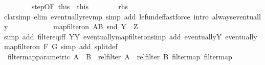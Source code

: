 \begin{isabellebody}
\ \ \ \ \ \ \isamarkupfalse%
\ step{\isacharbrackleft}{\kern0pt}OF\ this{\isacharparenleft}{\kern0pt}{}{\isacharcomma}{\kern0pt}\ {}{\isacharparenright}{\kern0pt}{\isacharbrackright}{\kern0pt}\ this{\isacharparenleft}{\kern0pt}{}{\isacharparenright}{\kern0pt}\isanewline
\ \ \ \ \ \ \isamarkupfalse%
\ {\isacharquery}{\kern0pt}rhs\ \isamarkupfalse%
{\isacharparenleft}{\kern0pt}clarsimp\ elim{\isacharbang}{\kern0pt}{\isacharcolon}{\kern0pt}\ eventually{\isacharunderscore}{\kern0pt}rev{\isacharunderscore}{\kern0pt}mp\ simp\ add{\isacharcolon}{\kern0pt}\ le{\isacharunderscore}{\kern0pt}fun{\isacharunderscore}{\kern0pt}def{\isacharparenright}{\kern0pt}{\isacharparenleft}{\kern0pt}fastforce\ intro{\isacharcolon}{\kern0pt}\ always{\isacharunderscore}{\kern0pt}eventually{\isacharparenright}{\kern0pt}\isanewline
\ \ \ \ \isamarkupfalse%
\isanewline
\ \ \ \ \isamarkupfalse%
\ \isamarkupfalse%
\ {\isachardoublequoteopen}map{\isacharunderscore}{\kern0pt}filter{\isacharunderscore}{\kern0pt}on\ {\isacharquery}{\kern0pt}AB\ snd\ Y\ {\isacharequal}{\kern0pt}\ {\isacharquery}{\kern0pt}Z{\isachardoublequoteclose}\isanewline
\ \ \ \ \ \ \isamarkupfalse%
{\isacharparenleft}{\kern0pt}simp\ add{\isacharcolon}{\kern0pt}\ filter{\isacharunderscore}{\kern0pt}eq{\isacharunderscore}{\kern0pt}iff\ YY\ eventually{\isacharunderscore}{\kern0pt}map{\isacharunderscore}{\kern0pt}filter{\isacharunderscore}{\kern0pt}on{\isacharparenright}{\kern0pt}{\isacharparenleft}{\kern0pt}simp\ add{\isacharcolon}{\kern0pt}\ eventually{\isacharunderscore}{\kern0pt}Y\ eventually{\isacharunderscore}{\kern0pt}map{\isacharunderscore}{\kern0pt}filter{\isacharunderscore}{\kern0pt}on\ F\ G{\isacharsemicolon}{\kern0pt}\ simp\ add{\isacharcolon}{\kern0pt}\ split{\isacharunderscore}{\kern0pt}def{\isacharparenright}{\kern0pt}\isanewline
\ \ \isamarkupfalse%
\isanewline
{}\isamarkupfalse%
%
\endisatagproof
{\isafoldproof}%
%
\isadelimproof
\isanewline
%
\endisadelimproof
\isanewline
{}\isamarkupfalse%
\ filtermap{\isacharunderscore}{\kern0pt}parametric{\isacharcolon}{\kern0pt}\ {\isachardoublequoteopen}{\isacharparenleft}{\kern0pt}{\isacharparenleft}{\kern0pt}A\ {\isacharequal}{\kern0pt}{\isacharequal}{\kern0pt}{\isacharequal}{\kern0pt}{\isachargreater}{\kern0pt}\ B{\isacharparenright}{\kern0pt}\ {\isacharequal}{\kern0pt}{\isacharequal}{\kern0pt}{\isacharequal}{\kern0pt}{\isachargreater}{\kern0pt}\ rel{\isacharunderscore}{\kern0pt}filter\ A\ {\isacharequal}{\kern0pt}{\isacharequal}{\kern0pt}{\isacharequal}{\kern0pt}{\isachargreater}{\kern0pt}\ rel{\isacharunderscore}{\kern0pt}filter\ B{\isacharparenright}{\kern0pt}\ filtermap\ filtermap{\isachardoublequoteclose}\isanewline

\end{isabellebody}
